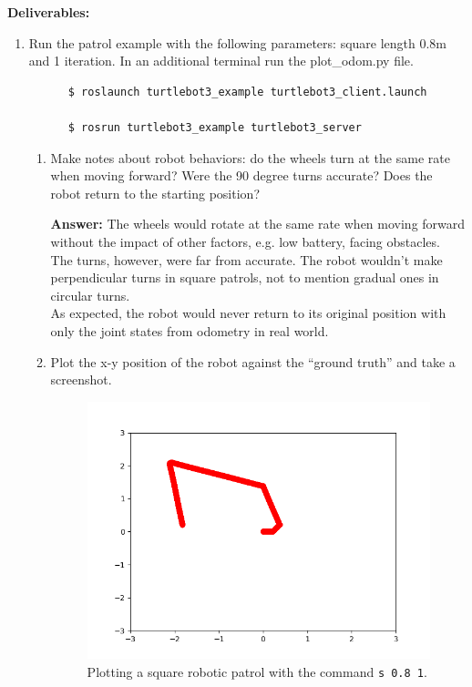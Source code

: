 \documentclass[12pt]{article}
\begin{document}
\textbf{Deliverables:}
\begin{enumerate}
    
    \item Run the patrol example with the following parameters: square length 0.8m and 1 iteration. In an additional terminal run the plot\_odom.py file.
    
    \begin{verbatim}
      $ roslaunch turtlebot3_example turtlebot3_client.launch
      
      $ rosrun turtlebot3_example turtlebot3_server
    \end{verbatim}

    \begin{enumerate}

        \item Make notes about robot behaviors: do the wheels turn at the same rate when moving forward? Were the 90 degree turns accurate? Does the robot return to the starting position?
        
        \textbf{Answer: }The wheels would rotate at the same rate when moving forward without the impact of other factors, e.g. low battery, facing obstacles.
        \\The turns, however, were far from accurate. The robot wouldn't make perpendicular turns in square patrols, not to mention gradual ones in circular turns.
        \\As expected, the robot would never return to its original position with only the joint states from odometry in real world.

        \item Plot the x-y position of the robot against the “ground truth” and take a screenshot.
        
        \begin{figure}[H]
          \centering\includegraphics[width=14cm]{images/gmapping.png}
          \caption{Plotting a square robotic patrol with the command \texttt{s 0.8 1}.}
          \label{fig:gmapping}\vspace{-10pt}
          \end{figure}


\end{enumerate}
\end{enumerate}
\end{document}
